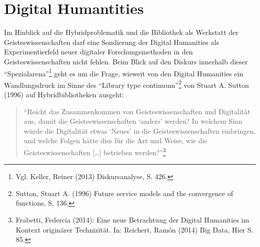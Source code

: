 \documentclass[a4paper,
fontsize=11pt,
oneside,
numbers=noperiodatend,
parskip=half-,
bibliography=totoc,
final
]{scrartcl}
\begin{document}
\section*{Digital Humantities}\label{digital-humantities}

Im Hinblick auf die Hybridproblematik und die Bibliothek als Werkstatt
der Geisteswissenschaften darf eine Sondierung der Digital Humanities
als Experimentierfeld neuer digitaler Forschungsmethoden in den
Geisteswissenschaften nicht fehlen. Beim Blick auf den Diskurs innerhalb
dieser \enquote{Spezialarena}\footnote{Vgl. Keller, Reiner (2013)
  Diskursanalyse, S. 426.} geht es um die Frage, wieweit von den Digital
Humanities ein Wandlungsdruck im Sinne des \enquote{Library type
continuum}\footnote{Sutton, Stuart A. (1996) Future service models and
  the convergence of functions, S. 136.} von Stuart A. Sutton (1996) auf
Hybridbibliotheken ausgeht:

\begin{quote}
\enquote{Reicht das Zusammenkommen von Geisteswissenschaften und
Digitalität aus, damit die Geisteswissenschaften \enquote{anders}
werden? In welchem Sinn würde die Digitalität etwas \enquote{Neues} in
die Geisteswissenschaften einbringen, und welche Folgen hätte dies für
die Art und Weise, wie die Geisteswissenschaften {[}\ldots{}{]}
betrieben werden?}\footnote{Frabetti, Federcia (2014): Eine neue
  Betrachtung der Digital Humanities im Kontext originärer Technizität.
  In: Reichert, Ramón (2014) Big Data, Hier S. 85.}
\end{quote}
\end{document}
